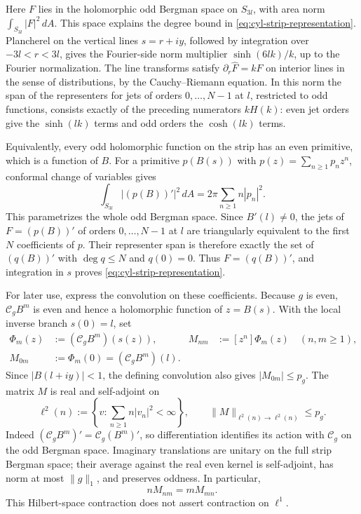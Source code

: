 Here \(F\) lies in the holomorphic odd Bergman space on \(S_{3l}\),
with area norm \(\int_{S_{3l}}|F|^2\,dA\).  This space explains the
degree bound in \eqref{eq:cyl-strip-representation}.  Plancherel on
the vertical lines \(s=r+iy\), followed by integration over
\(-3l<r<3l\), gives the Fourier-side norm multiplier
\(\sinh(6lk)/k\), up to the Fourier normalization.  The line
transforms satisfy
\(\partial_r\widehat F=k\widehat F\) on interior lines in the sense
of distributions, by the Cauchy--Riemann equation.  In this norm the
span of the representers for jets of orders \(0,\ldots,N-1\) at \(l\),
restricted to odd functions, consists exactly of the preceding
numerators \(kH(k)\): even jet orders give the \(\sinh(lk)\) terms
and odd orders the \(\cosh(lk)\) terms.

Equivalently, every odd holomorphic function on the strip has an even
primitive, which is a function of \(B\).  For a primitive
\(p(B(s))\) with \(p(z)=\sum_{n\ge1}p_nz^n\), conformal change of
variables gives
\[
 \int_{S_{3l}}|(p(B))'|^2\,dA
       =2\pi\sum_{n\ge1}n|p_n|^2.
\]
This parametrizes the whole odd Bergman space.  Since \(B'(l)\ne0\),
the jets of \(F=(p(B))'\) of orders \(0,\ldots,N-1\) at \(l\) are
triangularly equivalent to the first \(N\) coefficients of \(p\).
Their representer span is therefore exactly the set of \((q(B))'\)
with \(\deg q\le N\) and
\(q(0)=0\).  Thus \(F=(q(B))'\), and integration in \(s\) proves
\eqref{eq:cyl-strip-representation}.

For later use, express the convolution on these coefficients.
Because \(g\) is even, \(\mathcal C_g B^m\) is even and hence a
holomorphic function of \(z=B(s)\).  With the local inverse branch
\(s(0)=l\), set
\[
\begin{aligned}
 \Phi_m(z)&:=(\mathcal C_g B^m)(s(z)),&
 M_{nm}&:=[z^n]\Phi_m(z)\quad(n,m\ge1),\\
 M_{0m}&:=\Phi_m(0)=(\mathcal C_g B^m)(l).&&
\end{aligned}
\]
Since \(|B(l+iy)|<1\), the defining convolution also gives
\(|M_{0m}|\le p_g\).
The matrix \(M\) is real and self-adjoint on
\[
 \ell^2(n):=\left\{v:\sum_{n\ge1}n|v_n|^2<\infty\right\},
 \qquad \|M\|_{\ell^2(n)\to\ell^2(n)}\le p_g.
\]
Indeed \((\mathcal C_g B^m)'=\mathcal C_g(B^m)'\), so differentiation
identifies its action with \(\mathcal C_g\) on the odd Bergman space.
Imaginary translations are unitary on the
full strip Bergman space; their average against the real even kernel
is self-adjoint, has norm at most \(\|g\|_1\), and preserves oddness.
In particular,
\[
 nM_{nm}=mM_{mn}.
\]
This Hilbert-space contraction does not assert contraction on
\(\ell^1\).

